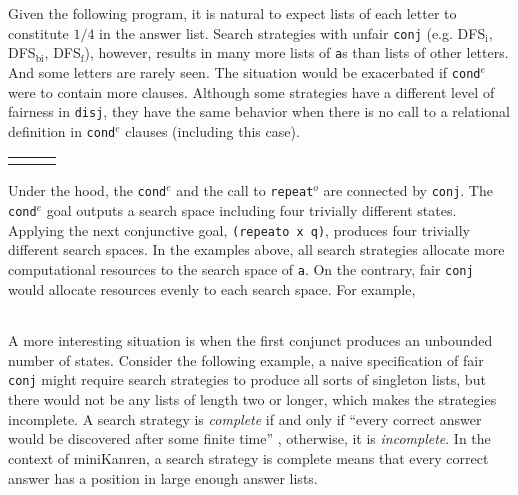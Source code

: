 \documentclass[format=acmlarge, review=true, authordraft=true]{acmart}
\newcommand{\conde}{\texttt{cond$^e$}}
\newcommand{\conj}{\texttt{conj}}
\newcommand{\disj}{\texttt{disj}}
\newcommand{\repeato}{\texttt{repeat$^o$}}
\newcommand{\DFSi }[0]{DFS$_\textrm{i}$}
\newcommand{\DFSf }[0]{DFS$_\textrm{f}$}
\newcommand{\DFSbi}[0]{DFS$_\textrm{bi}$}
\begin{document}
Given the following program, it is natural to expect lists of each letter to
constitute $1/4$ in the answer list. Search strategies with unfair \conj{} 
(e.g. 
\DFSi, \DFSbi, \DFSf), however, results in many more lists of \texttt{a}s than 
lists of other letters. And some letters are rarely seen. The situation would 
be exacerbated if \conde{} were to contain more clauses.
Although some strategies have a different level of fairness in \disj{}, they 
have the same behavior when there is no call to a relational definition in 
\conde{} clauses (including this case).

\begin{center}
\begin{tabular}{l|c|r}
     &
     &
     \\
\end{tabular}
\end{center}

Under the hood, the \conde{} and the call to \repeato{} are connected by 
\conj{}. The \conde{} goal outputs a search space including four trivially 
different states. 
Applying the next conjunctive goal, \texttt{(repeato x q)}, produces four 
trivially different search spaces.
In the examples above, all search strategies allocate more computational 
resources to the search space of \texttt{a}. On the contrary, fair \conj{} 
would allocate resources evenly to each search space. For example,

\begin{center}
	\begin{tabular}{c}
		
	\end{tabular}
\end{center}

A more interesting situation is when the first conjunct produces an unbounded
number of states. Consider the following example, a naive specification of 
fair \conj{} 
might require search strategies to produce all sorts of singleton lists, but 
there
would not be any lists of length two or longer, which makes the strategies 
incomplete. 
A search strategy is \emph{complete} if and only if ``every correct answer 
would be discovered after some finite time'' \cite{seres1999algebra}, 
otherwise, it is \emph{incomplete}. In the 
context of miniKanren, a search strategy is complete means that every correct 
answer has a position in large enough answer lists.
\end{document}
